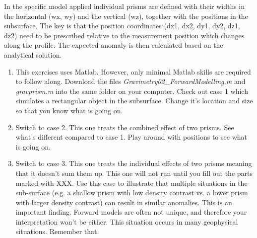 In the specific model applied individual prisms are defined with their widths in the horizontal (wx, wy) and the vertical (wz), together with the positions in the subsurface. The key is that the position coordinates (dx1, dx2, dy1, dy2, dz1, dz2) need to be prescribed relative to the measurement position which changes along the profile. The expected anomaly is then calculated based on the analytical solution.
\begin{enumerate}[label=(\alph*)]

  \item This exercises uses Matlab. However, only minimal Matlab skills are required to follow along. Download the files \textit{Gravimetry02\_ForwardModelling.m} and \textit{gravprism.m} into the same folder on your computer. Check out case 1 which simulates a rectangular object in the subsurface. Change it's location and size so that you know what is going on.

  \item Switch to case 2. This one treats the combined effect of two prisms. See what's different compared to case 1. Play around with positions to see what is going on.

  \item Switch to case 3. This one treats the individual effects of two prisms meaning that it doesn't sum them up. This one will not run until you fill out the parts marked with XXX. Use this case to illustrate that multiple situations in the sub-surface (e.g. a shallow prism with low density contrast vs. a lower prism with larger density contrast) can result in similar anomalies. This is an important finding. Forward models are often not unique, and therefore your interpretation won't be either. This situation occurs in many geophysical situations. Remember that.
\end{enumerate}
\begin{tcolorbox}[enhanced jigsaw,breakable,pad at break*=1mm,
  colback=blue!5!white,colframe=babyblueeyes,title=Solutions,
  watermark color=white]
  
\end{tcolorbox}
